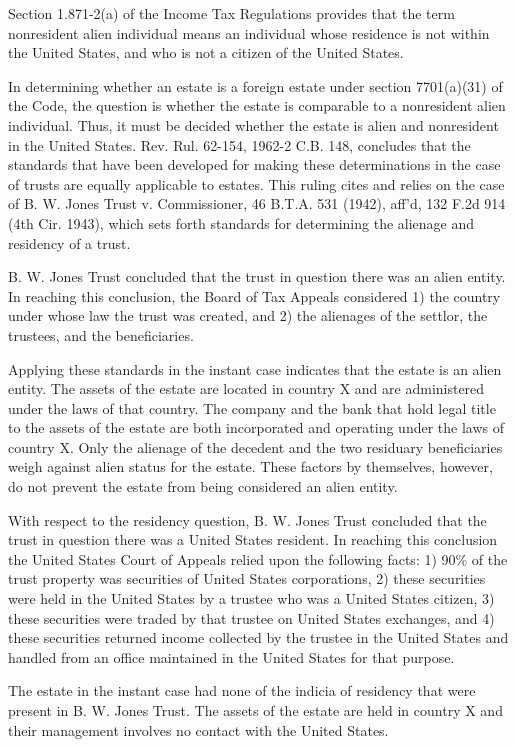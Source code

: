 \begin{select}
  Section 1.871-2(a) of the Income Tax Regulations provides that the term nonresident alien individual means an individual whose residence is not within the United States, and who is not a citizen of the United States.

  In determining whether an estate is a foreign estate under section 7701(a)(31) of the Code, the question is whether the estate is comparable to a nonresident alien individual.  Thus, it must be decided whether the estate is alien and nonresident in the United States.  Rev. Rul. 62-154, 1962-2 C.B. 148, concludes that the standards that have been developed for making these determinations in the case of trusts are equally applicable to estates.  This ruling cites and relies on the case of B. W. Jones Trust v. Commissioner, 46 B.T.A. 531 (1942), aff'd, 132 F.2d 914 (4th Cir. 1943), which sets forth standards for determining the alienage and residency of a trust.

  B. W. Jones Trust concluded that the trust in question there was an alien entity.  In reaching this conclusion, the Board of Tax Appeals considered 1) the country under whose law the trust was created, and 2) the alienages of the settlor, the trustees, and the beneficiaries.

  Applying these standards in the instant case indicates that the estate is an alien entity.  The assets of the estate are located in country X and are administered under the laws of that country. The company and the bank that hold legal title to the assets of the estate are both incorporated and operating under the laws of country X.  Only the alienage of the decedent and the two residuary beneficiaries weigh against alien status for the estate.  These factors by themselves, however, do not prevent the estate from being considered an alien entity.

  With respect to the residency question, B. W. Jones Trust concluded that the trust in question there was a United States resident.  In reaching this conclusion the United States Court of Appeals relied upon the following facts: 1) 90\% of the trust property was securities of United States corporations, 2) these securities were held in the United States by a trustee who was a United States citizen, 3) these securities were traded by that trustee on United States exchanges, and 4) these securities returned income collected by the trustee in the United States and handled from an office maintained in the United States for that purpose.

  The estate in the instant case had none of the indicia of residency that were present in B. W. Jones Trust.  The assets of the estate are held in country X and their management involves no contact with the United States.


\end{select}
